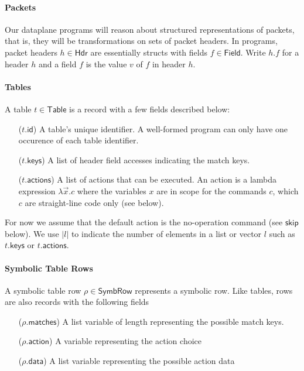 \documentclass{article}
\newcommand{\Hdr}{\mathsf{Hdr}}
\newcommand{\Field}{\mathsf{Field}}
\newcommand{\Table}{\mathsf{Table}}
\newcommand{\SymbRow}{\mathsf{SymbRow}}
\newcommand{\matches}{\mathsf{matches}}
\newcommand{\action}{\mathsf{action}}
\newcommand{\actions}{\mathsf{actions}}
\newcommand{\keys}{\mathsf{keys}}
\newcommand{\data}{\mathsf{data}}
\newcommand{\id}{\mathsf{id}}
\newcommand{\SKIP}{\mathsf{skip}}
\begin{document}
\paragraph{Packets}
Our dataplane programs will reason about structured representations of packets,
that is, they will be transformations on sets of packet headers. In programs,
packet headers $h \in \Hdr$ are essentially structs with fields $f \in
\Field$. Write $h.f$ for a header $h$ and a field $f$ is the value $v$ of $f$
in header $h$.

\paragraph{Tables}
A table $t \in \Table$ is a record with a few fields described below:
\begin{enumerate}[align=left]
  \item[($t.\id$)] A table's unique identifier. A well-formed program can only have
    one occurence of each table identifier.
  \item[($t.\keys$)] A list of header field accesses indicating the match keys.
  \item[($t.\actions$)] A list of actions that can be executed. An action is a lambda
    expression $\lambda \vec x. c$ where the variables $x$ are in scope for the
    commands $c$, which $c$ are straight-line code only (see below).
\end{enumerate}
For now we assume that the default action is the no-operation command (see
$\SKIP$ below). We use $|l|$ to indicate the number of elements in a list or vector $l$
such as $t.\keys$ or $t.\actions$.


\paragraph{Symbolic Table Rows}
A symbolic table row $\rho \in \SymbRow$ represents a symbolic row. Like tables,
rows are also records with the following fields 
\begin{enumerate}[align=left]
  \item[($\rho.\matches$)] A list variable of length representing the possible match keys.
  \item[($\rho.\action$)] A variable representing the action choice
  \item[($\rho.\data$)] A list variable representing the possible action data
\end{enumerate}
\end{document}
